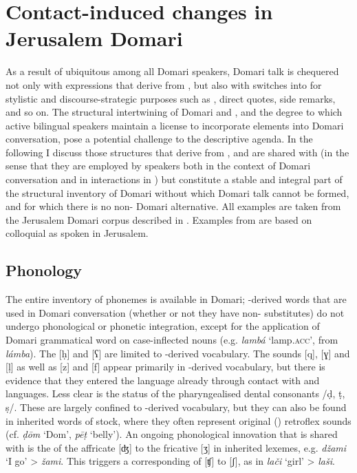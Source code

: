 \documentclass[output=paper]{langsci/langscibook}
\begin{document}
\section{Contact-induced changes in Jerusalem Domari
}

As a result of ubiquitous  among all Domari speakers, Domari talk is chequered not only with expressions that derive from , but also with switches into  for stylistic and discourse-strategic purposes such as , direct quotes, side remarks, and so on. The structural intertwining of Domari and , and the degree to which active bilingual speakers maintain a license to incorporate  elements into Domari conversation, pose a potential challenge to the descriptive agenda. In the following I discuss those structures that derive from , and are shared with  (in the sense that they are employed by speakers both in the context of Domari conversation and in interactions in ) but constitute a stable and integral part of the structural inventory of Domari without which Domari talk cannot be formed, and for which there is no non- Domari alternative. All examples are taken from the Jerusalem Domari corpus described in \citet{Matras2012}. Examples from  are based on colloquial   as spoken in Jerusalem.

\subsection{Phonology
}

The entire inventory of   phonemes is available in Domari; -derived words that are used in Domari conversation (whether or not they have non- substitutes) do not undergo phonological or phonetic integration, except for the application of Domari grammatical word  on case-inflected nouns (e.g. \textit{lambá} ‘lamp.\textsc{acc}’, from  \textit{lámba}). The  [ḥ] and [{ʕ}] are limited to -derived vocabulary. The sounds [q], [{ɣ}] and [ḷ] as well as [z] and [f] appear primarily in -derived vocabulary, but there is evidence that they entered the language already through contact with  and  languages. Less clear is the status of the pharyngealised dental consonants /ḍ, ṭ, ṣ/. These are largely confined to -derived vocabulary, but they can also be found in inherited words of  stock, where they often represent original () retroflex sounds (cf. \textit{ḍōm} ‘Dom’, \textit{pēṭ} ‘belly’). An ongoing phonological innovation that is shared with   is the  of the affricate [{ʤ}] to the fricative [{ʒ}] in inherited lexemes, e.g. \textit{džami} ‘I go’ > \textit{žami}. This triggers a corresponding  of [{ʧ}] to [{ʃ}], as in \textit{lači} ‘girl’ > \textit{laši}.
\end{document}
